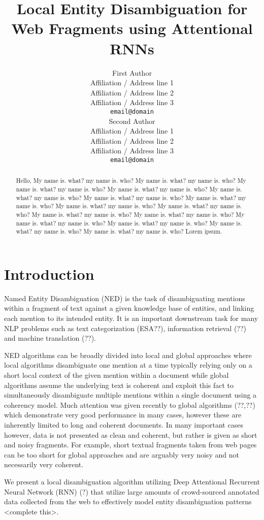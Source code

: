 \documentclass[11pt]{article}
\title{Local Entity Disambiguation for Web Fragments using Attentional RNNs}
\author{First Author \\
  Affiliation / Address line 1 \\
  Affiliation / Address line 2 \\
  Affiliation / Address line 3 \\
  {\tt email@domain} \\\And
  Second Author \\
  Affiliation / Address line 1 \\
  Affiliation / Address line 2 \\
  Affiliation / Address line 3 \\
  {\tt email@domain} \\}
\date{}
\begin{document}
\maketitle
\begin{abstract}
Hello, My name is. what? my name is. who?
My name is. what? my name is. who?
My name is. what? my name is. who?
My name is. what? my name is. who?
My name is. what? my name is. who?
My name is. what? my name is. who?
My name is. what? my name is. who?
My name is. what? my name is. who?
My name is. what? my name is. who?
My name is. what? my name is. who?
My name is. what? my name is. who?
My name is. what? my name is. who?
My name is. what? my name is. who?
My name is. what? my name is. who?
My name is. what? my name is. who? Lorem ipsum.
\end{abstract}

\section{Introduction}

Named Entity Disambiguation (NED) is the task of disambiguating mentions within a fragment of text against a given knowledge base of entities, and linking each mention to its intended entity. It is an important downstream task for many NLP problems such as text categorization (ESA??), information retrieval (??) and machine translation (??). 

NED algorithms can be broadly divided into local and global approaches where local algorithms disambiguate one mention at a time typically relying only on a short local context of the given mention within a document while global algorithms assume the underlying text is coherent and exploit this fact to simultaneously disambiguate multiple mentions within a single document using a coherency model. Much attention was given recently to global algorithms (??,??) which demonstrate very good performance in many cases, however these are inherently limited to long and coherent documents. In many important cases however, data is not presented as clean and coherent, but rather is given as short and noisy fragments. For example, short textual fragments taken from web pages can be too short for global approaches and are arguably very noisy and not necessarily very coherent. 

We present a local disambiguation algorithm utilizing Deep Attentional Recurrent Neural Network (RNN) (?) that utilize large amounts of crowd-sourced annotated data collected from the web to effectively model entity disambiguation patterns <complete this>. 
\end{document}
